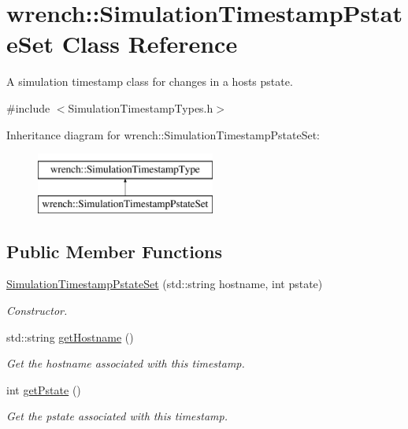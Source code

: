 \hypertarget{classwrench_1_1_simulation_timestamp_pstate_set}{}\section{wrench\+:\+:Simulation\+Timestamp\+Pstate\+Set Class Reference}
\label{classwrench_1_1_simulation_timestamp_pstate_set}


A simulation timestamp class for changes in a host\textquotesingle{}s pstate.  




{\ttfamily \#include $<$Simulation\+Timestamp\+Types.\+h$>$}

Inheritance diagram for wrench\+:\+:Simulation\+Timestamp\+Pstate\+Set\+:\begin{figure}[H]
\begin{center}
\leavevmode
\includegraphics[height=2.000000cm]{classwrench_1_1_simulation_timestamp_pstate_set}
\end{center}
\end{figure}
\subsection*{Public Member Functions}
\begin{DoxyCompactItemize}
\item 
\hyperlink{classwrench_1_1_simulation_timestamp_pstate_set_a90b4a6b8d9b8eed633c1724fc9b24ed2}{Simulation\+Timestamp\+Pstate\+Set} (std\+::string hostname, int pstate)
\begin{DoxyCompactList}\small\item\em Constructor. \end{DoxyCompactList}\item 
std\+::string \hyperlink{classwrench_1_1_simulation_timestamp_pstate_set_a255103b3ace42f65ca27d34ce9b02bdb}{get\+Hostname} ()
\begin{DoxyCompactList}\small\item\em Get the hostname associated with this timestamp. \end{DoxyCompactList}\item 
int \hyperlink{classwrench_1_1_simulation_timestamp_pstate_set_aa16b326fe7c60ec75ed6468d94183c0d}{get\+Pstate} ()
\begin{DoxyCompactList}\small\item\em Get the pstate associated with this timestamp. \end{DoxyCompactList}\end{DoxyCompactItemize}


